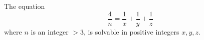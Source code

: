 \begin{proposition}\label{eq:184}
    The equation
\[
    \frac{4}{n}=\frac{1}{x}+\frac{1}{y}+\frac{1}{z}
\]
    where $n$ is an integer $>3$, is solvable in positive integers $x,y,z$.
\end{proposition}
